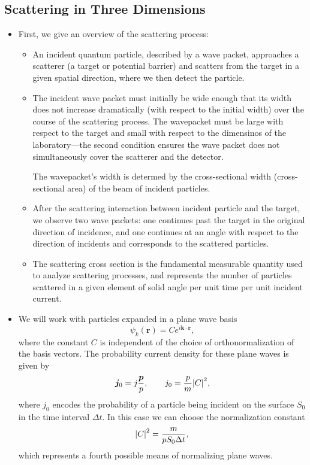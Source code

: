 \documentclass[11pt, a4paper]{article}
\renewcommand{\vec}[1]{\bm{#1}}  %
\renewcommand{\r}{\vec{r}}  %
\begin{document}
\subsection{Scattering in Three Dimensions}
\begin{itemize}
    \item First, we give an overview of the scattering process:
    \begin{itemize}
        \item An incident quantum particle, described by a wave packet, approaches a scatterer (a target or potential barrier) and scatters from the target in a given spatial direction, where we then detect the particle.

        \item The incident wave packet must initially be wide enough that its width does not increase dramatically (with respect to the initial width) over the course of the scattering process. The wavepacket must be large with respect to the target and small with respect to the dimensinos of the laboratory---the second condition ensures the wave packet does not simultaneously cover the scatterer and the detector. 

        The wavepacket's width is determed by the cross-sectional width (cross-sectional area) of the beam of incident particles. 

        \item After the scattering interaction between incident particle and the target, we observe two wave packets: one continues past the target in the original direction of incidence, and one continues at an angle with respect to the direction of incidents and corresponds to the scattered particles. 

        \item The scattering cross section is the fundamental measurable quantity used to analyze scattering processes, and represents the number of particles scattered in a given element of solid angle per unit time per unit incident current.

    \end{itemize}

    \item We will work with particles expanded in a plane wave basis
    \begin{equation*}
        \psi_{k}(\r) = C e^{i \vec{k} \cdot \r},
    \end{equation*}
    where the constant $ C $ is independent of the choice of orthonormalization of the basis vectors. The probability current density for these plane waves is given by
    \begin{equation*}
        \vec{j}_{0} = j_{} \frac{\vec{p}}{p}, \qquad j_{0} = \frac{p}{m} \abs{C}^{2},
    \end{equation*}
    where $ j_{0} $ encodes the probability of a particle being incident on the surface $ S_{0} $ in the time interval $ \Delta t $. In this case we can choose the normalization constant 
    \begin{equation*}
        \abs{C}^{2} = \frac{m}{pS_{0}\Delta t},
    \end{equation*}
    which represents a fourth possible means of normalizing plane waves. 


\end{itemize}
\end{document}
